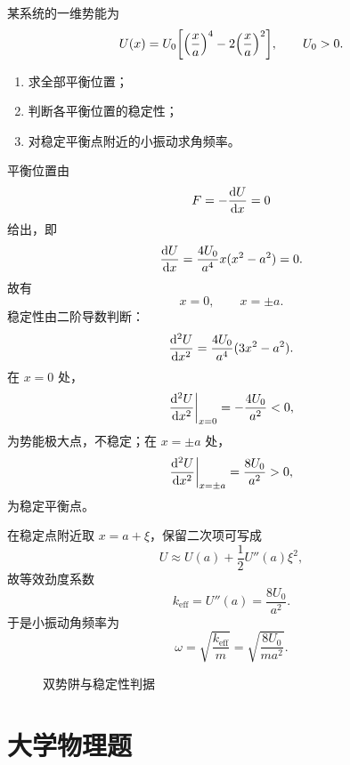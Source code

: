 \begin{competition}
某系统的一维势能为
\[
U(x)=U_0\qty[\qty(\frac{x}{a})^4-2\qty(\frac{x}{a})^2],\qquad U_0>0.
\]
\begin{enumerate}
  \item 求全部平衡位置；
  \item 判断各平衡位置的稳定性；
  \item 对稳定平衡点附近的小振动求角频率。
\end{enumerate}
\begin{solution}
平衡位置由
\[
F=-\dv{U}{x}=0
\]
给出，即
\[
\dv{U}{x}=\frac{4U_0}{a^4}x(x^2-a^2)=0.
\]
故有
\[
x=0,\qquad x=\pm a.
\]
稳定性由二阶导数判断：
\[
\dv[2]{U}{x}=\frac{4U_0}{a^4}(3x^2-a^2).
\]
在 $x=0$ 处，
\[
\dv[2]{U}{x}\bigg|_{x=0}=-\frac{4U_0}{a^2}<0,
\]
为势能极大点，不稳定；在 $x=\pm a$ 处，
\[
\dv[2]{U}{x}\bigg|_{x=\pm a}=\frac{8U_0}{a^2}>0,
\]
为稳定平衡点。

在稳定点附近取 $x=a+\xi$，保留二次项可写成
\[
U\approx U(a)+\frac12 U''(a)\xi^2,
\]
故等效劲度系数
\[
k_{\text{eff}}=U''(a)=\frac{8U_0}{a^2}.
\]
于是小振动角频率为
\[
\omega=\sqrt{\frac{k_{\text{eff}}}{m}}=\sqrt{\frac{8U_0}{ma^2}}.
\]

\begin{figure}[H]
\centering
{}
\caption{双势阱与稳定性判据}
\end{figure}
\end{solution}
\end{competition}

\section{大学物理题}


